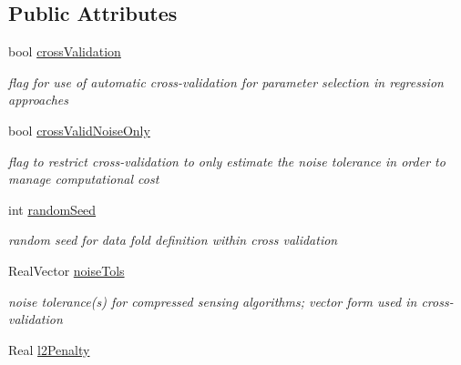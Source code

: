 \subsection*{Public Attributes}
\begin{DoxyCompactItemize}
\item 
bool \hyperlink{classPecos_1_1RegressionConfigOptions_a0ba5c334e2daf8be3edc89f827ea125c}{cross\+Validation}\label{classPecos_1_1RegressionConfigOptions_a0ba5c334e2daf8be3edc89f827ea125c}

\begin{DoxyCompactList}\small\item\em flag for use of automatic cross-\/validation for parameter selection in regression approaches \end{DoxyCompactList}\item 
bool \hyperlink{classPecos_1_1RegressionConfigOptions_a752c167c63d9374fe0d8fdadca28cb8e}{cross\+Valid\+Noise\+Only}\label{classPecos_1_1RegressionConfigOptions_a752c167c63d9374fe0d8fdadca28cb8e}

\begin{DoxyCompactList}\small\item\em flag to restrict cross-\/validation to only estimate the noise tolerance in order to manage computational cost \end{DoxyCompactList}\item 
int \hyperlink{classPecos_1_1RegressionConfigOptions_a81ab89411a148610c9749af8e95cd453}{random\+Seed}\label{classPecos_1_1RegressionConfigOptions_a81ab89411a148610c9749af8e95cd453}

\begin{DoxyCompactList}\small\item\em random seed for data fold definition within cross validation \end{DoxyCompactList}\item 
Real\+Vector \hyperlink{classPecos_1_1RegressionConfigOptions_abec255ef7568470cde3f5a4bf91c5f80}{noise\+Tols}\label{classPecos_1_1RegressionConfigOptions_abec255ef7568470cde3f5a4bf91c5f80}

\begin{DoxyCompactList}\small\item\em noise tolerance(s) for compressed sensing algorithms; vector form used in cross-\/validation \end{DoxyCompactList}\item 
Real \hyperlink{classPecos_1_1RegressionConfigOptions_a0639ce5a6380e9d257d0bc8d428df9cd}{l2\+Penalty}\label{classPecos_1_1RegressionConfigOptions_a0639ce5a6380e9d257d0bc8d428df9cd}


\end{DoxyCompactItemize}
